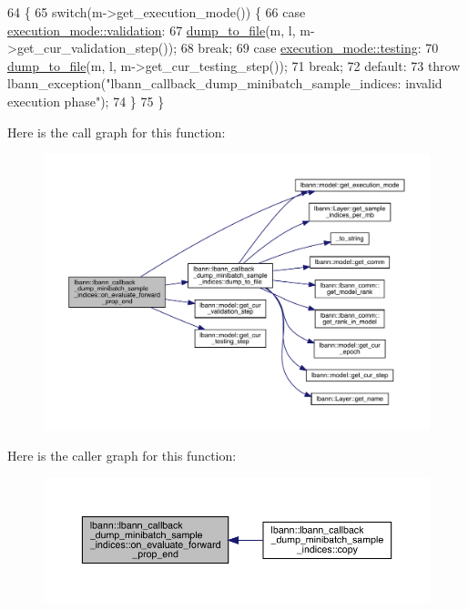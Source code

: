 \begin{DoxyCode}
64                                                                                                   \{
65   \textcolor{keywordflow}{switch}(m->get\_execution\_mode()) \{
66   \textcolor{keywordflow}{case} \hyperlink{base_8hpp_a2781a159088df64ed7d47cc91c4dc0a8aa617908b172c473cb8e8cda059e55bf0}{execution\_mode::validation}:
67     \hyperlink{classlbann_1_1lbann__callback__dump__minibatch__sample__indices_a34d4564309168b3ab0b2e3092e2f9355}{dump\_to\_file}(m, l, m->get\_cur\_validation\_step());
68     \textcolor{keywordflow}{break};
69   \textcolor{keywordflow}{case} \hyperlink{base_8hpp_a2781a159088df64ed7d47cc91c4dc0a8aae2b1fca515949e5d54fb22b8ed95575}{execution\_mode::testing}:
70     \hyperlink{classlbann_1_1lbann__callback__dump__minibatch__sample__indices_a34d4564309168b3ab0b2e3092e2f9355}{dump\_to\_file}(m, l, m->get\_cur\_testing\_step());
71     \textcolor{keywordflow}{break};
72   \textcolor{keywordflow}{default}:
73     \textcolor{keywordflow}{throw} lbann\_exception(\textcolor{stringliteral}{"lbann\_callback\_dump\_minibatch\_sample\_indices: invalid execution phase"});
74   \}
75 \}
\end{DoxyCode}
Here is the call graph for this function\+:\nopagebreak
\begin{figure}[H]
\begin{center}
\leavevmode
\includegraphics[width=350pt]{classlbann_1_1lbann__callback__dump__minibatch__sample__indices_acb641b979a37cc703994103a4e8428a5_cgraph}
\end{center}
\end{figure}
Here is the caller graph for this function\+:\nopagebreak
\begin{figure}[H]
\begin{center}
\leavevmode
\includegraphics[width=350pt]{classlbann_1_1lbann__callback__dump__minibatch__sample__indices_acb641b979a37cc703994103a4e8428a5_icgraph}
\end{center}
\end{figure}
